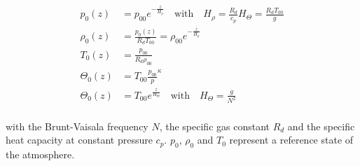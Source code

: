\begin{equation}
\begin{aligned}
    p_0(z) &= p_{00} e^{-\frac{z}{H_{\rho}}} \quad \textrm{with} \quad H_{\rho} = \frac{R_d}{c_p} H_{\Theta} = \frac{R_d T_{00}}{g} \\
    \rho_0(z) &= \frac{p_0(z)}{R_d T_{00}} = \rho_{00} e^{-\frac{z}{H_{\rho}}} \\
    T_0(z) &= \frac{p_{00}}{R_d \rho_{00}} \\
    \Theta_0(z) &= T_{00} \frac{p_{00}}{p}^{\kappa} \\
    \Theta_0(z) &= T_{00} e^{\frac{z}{H_{\Theta}}} \quad \textrm{with} \quad H_{\Theta} = \frac{g}{N^2} \\
    \label{equ:ambient-Profiles}
\end{aligned}
\end{equation}

with the Brunt-Vaisala frequency $N$, the specific gas constant $R_d$ and the specific heat capacity at constant pressure $c_p$. $p_0$, $\rho_0$ and $T_0$ represent a reference state of the atmosphere.

